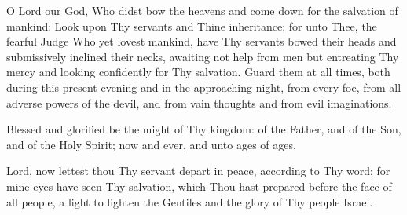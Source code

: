 \documentclass[twoside, letterpaper, 12pt]{report}
\begin{document}
\begin{priest}
\item O Lord our God, Who didst bow the heavens and come down for the salvation of
    mankind: Look upon Thy servants and Thine inheritance; for unto Thee, the fearful
    Judge Who yet lovest mankind, have Thy servants bowed their heads and
    submissively inclined their necks, awaiting not help from men but entreating Thy
    mercy and looking confidently for Thy salvation. Guard them at all times, both
    during this present evening and in the approaching night, from every foe, from all
    adverse powers of the devil, and from vain thoughts and from evil imaginations.
\item Blessed and glorified be the might of Thy kingdom: of the Father, and of the Son,
    and of the Holy Spirit; now and ever, and unto ages of ages.
\end{priest}



\vbox{}

\vbox{}

\cleardoublepage


Lord, now lettest thou Thy servant depart in peace, according to Thy word; for mine eyes
have seen Thy salvation, which Thou hast prepared before the face of all people, a light to lighten
the Gentiles and the glory of Thy people Israel.





\vbox{}
\end{document}
